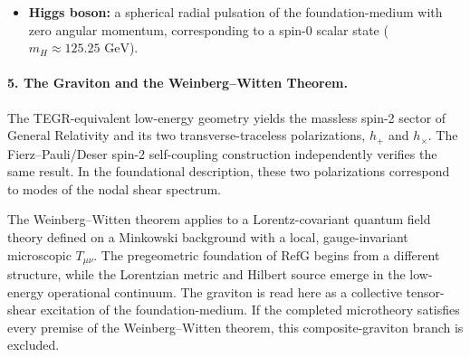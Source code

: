 \documentclass[11pt,a4paper]{article}
\newcommand{\RefG}{\mathrm{RefG}}
\begin{document}
\begin{itemize}
\begin{equation}
\begin{aligned}
m_1 &= 0.3608\text{ meV}, \qquad m_2 = 8.6419\text{ meV}, \qquad m_3 = 50.2675\text{ meV}, \\
\Delta m_{21}^2 &= 7.455\times 10^{-5}\text{ eV}^2\ \ (\mathbf{+0.22\sigma}), \qquad \Delta m_{31}^2 = 2.5267\times 10^{-3}\text{ eV}^2\ \ (\mathbf{+0.58\sigma}), \\
\Delta m_{32}^2 &= 2.4521\times 10^{-3}\text{ eV}^2\ \ (\mathbf{-0.03\sigma}), \qquad \sum_{i=1}^3 m_{\nu_i} = 0.05927\text{ eV} < 0.072\text{ eV},
\end{aligned}
\end{equation}
satisfying the Planck 2018 + DESI 2024 cosmological upper bound ($\sum m_\nu < 0.072\text{ eV}$) and predicting the kinematic tritium beta-endpoint mass $m_\beta = \sqrt{\sum_i |U_{ei}|^2 m_i^2} = 8.837\text{ meV}$ ($< 0.45\text{ eV}$, KATRIN) and the neutrinoless double-beta decay effective Majorana mass $m_{\beta\beta} = |\sum_i U_{ei}^2 m_i| = 3.878\text{ meV}$;
\item \textbf{Higgs boson:} a spherical radial pulsation of the foundation-medium with zero angular momentum, corresponding to a spin-0 scalar state ($m_H\approx125.25\text{ GeV}$).
\end{itemize}

\paragraph{5. The Graviton and the Weinberg--Witten Theorem.} The TEGR-equivalent low-energy geometry yields the massless spin-2 sector of General Relativity and its two transverse-traceless polarizations, $h_+$ and $h_\times$. The Fierz--Pauli/Deser spin-2 self-coupling construction independently verifies the same result. In the foundational description, these two polarizations correspond to modes of the nodal shear spectrum.

The Weinberg--Witten theorem \citep{weinbergwitten1980} applies to a Lorentz-covariant quantum field theory defined on a Minkowski background with a local, gauge-invariant microscopic $T_{\mu\nu}$. The pregeometric foundation of $\RefG$ begins from a different structure, while the Lorentzian metric and Hilbert source emerge in the low-energy operational continuum. The graviton is read here as a collective tensor-shear excitation of the foundation-medium. If the completed microtheory satisfies every premise of the Weinberg--Witten theorem, this composite-graviton branch is excluded.
\end{document}
